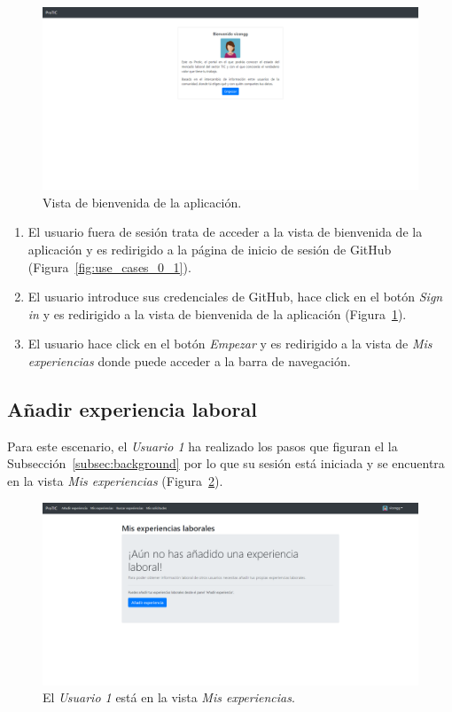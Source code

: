 \documentclass[a4paper, 12pt]{book}
\begin{document}
    \begin{figure}
        \centering
        \includegraphics[width=15cm, keepaspectratio]{img/0.2.png}
        \caption{Vista de bienvenida de la aplicación.}\label{fig:use_cases_0_2}
    \end{figure}

    \begin{enumerate}
        \item El usuario fuera de sesión trata de acceder a la vista de bienvenida de la aplicación y es redirigido a la página de inicio de
        sesión de GitHub (Figura~\ref{fig:use_cases_0_1}).
        \item El usuario introduce sus credenciales de GitHub, hace click en el botón \emph{Sign in}
        y es redirigido a la vista de bienvenida de la aplicación (Figura~\ref{fig:use_cases_0_2}).
        \item El usuario hace click en el botón \emph{Empezar}
        y es redirigido a la vista de \emph{Mis experiencias} donde puede acceder a la barra de navegación.
    \end{enumerate}

    \subsection{Añadir experiencia laboral}
    \label{subsec:add_work_experience}
    Para este escenario, el \emph{Usuario 1} ha realizado los pasos que figuran el la Subsección~\ref{subsec:background}
    por lo que su sesión está iniciada y se encuentra en la vista \emph{Mis experiencias} (Figura~\ref{fig:use_cases_1_1}).

    \begin{figure}
        \centering
        \includegraphics[width=15cm, keepaspectratio]{img/1.1.png}
        \caption{El \emph{Usuario 1} está en la vista \emph{Mis experiencias}.}
        \label{fig:use_cases_1_1}
    \end{figure}
\end{document}
